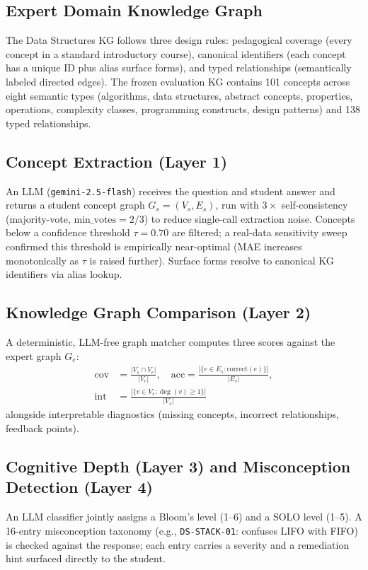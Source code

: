\documentclass[conference]{IEEEtran}
\begin{document}
\subsection{Expert Domain Knowledge Graph}
The Data Structures KG follows three design rules: pedagogical coverage
(every concept in a standard introductory course), canonical identifiers
(each concept has a unique ID plus alias surface forms), and typed
relationships (semantically labeled directed edges). The frozen evaluation
KG contains 101 concepts across eight semantic types (algorithms, data
structures, abstract concepts, properties, operations, complexity classes,
programming constructs, design patterns) and 138 typed relationships.

\subsection{Concept Extraction (Layer 1)}
An LLM (\texttt{gemini-2.5-flash}) receives the question and student answer
and returns a student concept graph $G_s=(V_s,E_s)$, run with $3\times$
self-consistency (majority-vote, $\text{min\_votes}=2/3$) to reduce
single-call extraction noise. Concepts below a confidence threshold
$\tau=0.70$ are filtered; a real-data sensitivity sweep confirmed this
threshold is empirically near-optimal (MAE increases monotonically as
$\tau$ is raised further). Surface forms resolve to canonical KG
identifiers via alias lookup.

\subsection{Knowledge Graph Comparison (Layer 2)}
A deterministic, LLM-free graph matcher computes three scores against the
expert graph $G_e$:
\begin{align}
  \text{cov} &= \frac{|V_s \cap V_e|}{|V_e|}, \quad
  \text{acc} = \frac{|\{e \in E_s : \text{correct}(e)\}|}{|E_s|}, \nonumber \\
  \text{int} &= \frac{|\{v \in V_s : \deg(v) \geq 1\}|}{|V_s|}
\end{align}
alongside interpretable diagnostics (missing concepts, incorrect
relationships, feedback points).

\subsection{Cognitive Depth (Layer 3) and Misconception Detection (Layer 4)}
An LLM classifier jointly assigns a Bloom's level (1--6) and a SOLO level
(1--5). A 16-entry misconception taxonomy (e.g., \texttt{DS-STACK-01}:
confuses LIFO with FIFO) is checked against the response; each entry carries
a severity and a remediation hint surfaced directly to the student.
\end{document}
